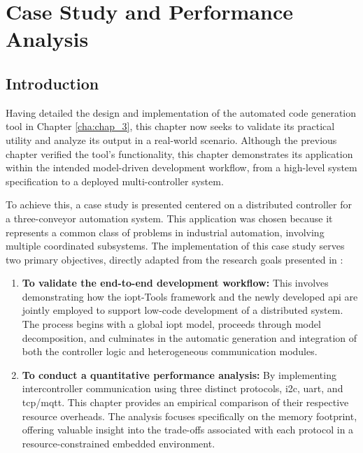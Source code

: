 
%


\chapter{Case Study and Performance Analysis}
\label{cha:case_study}


%

\section{Introduction}
\label{sec:case_study_intro}

Having detailed the design and implementation of the automated code generation tool in Chapter \ref{cha:chap_3}, this chapter now seeks to validate its practical utility and analyze its output in a real-world scenario. Although the previous chapter verified the tool's functionality, this chapter demonstrates its application within the intended model-driven development workflow, from a high-level system specification to a deployed multi-controller system.

To achieve this, a case study is presented centered on a distributed controller for a three-conveyor automation system. This application was chosen because it represents a common class of problems in industrial automation, involving multiple coordinated subsystems. The implementation of this case study serves two primary objectives, directly adapted from the research goals presented in \cite{tavaresgomes2026}:

\begin{enumerate}
    \item \textbf{To validate the end-to-end development workflow:} This involves demonstrating how the \gls{iopt}-Tools framework and the newly developed \gls{api} are jointly employed to support low-code development of a distributed system. The process begins with a global \gls{iopt} model, proceeds through model decomposition, and culminates in the automatic generation and integration of both the controller logic and heterogeneous communication modules.
    
    \item \textbf{To conduct a quantitative performance analysis:} By implementing intercontroller communication using three distinct protocols, \gls{i2c}, \gls{uart}, and \gls{tcp}/\gls{mqtt}. This chapter provides an empirical comparison of their respective resource overheads. The analysis focuses specifically on the memory footprint, offering valuable insight into the trade-offs associated with each protocol in a resource-constrained embedded environment.
\end{enumerate}

